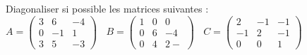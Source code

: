 \documentclass[12pt,a4paper]{report}
\newcounter{exo}[section]
\begin{document}
\exo

Diagonaliser si possible les matrices suivantes : \\
$A=\begin{pmatrix}
	3&6&-4\\
	0&-1&1\\
	3&5&-3
\end{pmatrix}~~~~
B=\begin{pmatrix}
	1&0&0\\
	0&6&-4\\
	0&4&2-
\end{pmatrix}~~~~
C=\begin{pmatrix}
	2&-1&-1\\
	-1&2&-1\\
	0&0&1	
\end{pmatrix}$



\end{document}
